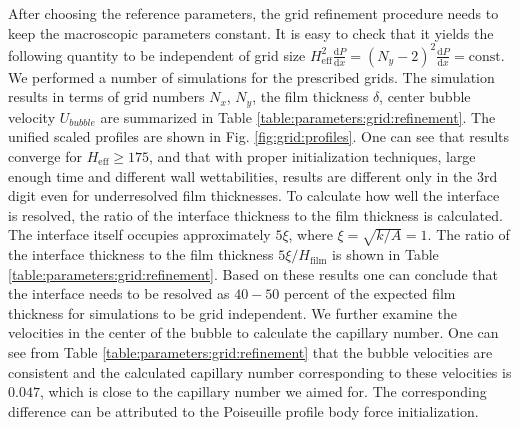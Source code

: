 \documentclass[preprint,12pt]{elsarticle}
\begin{document}
After choosing the reference parameters, the grid refinement procedure
needs to keep the macroscopic parameters constant.  It is easy to check
that it yields the following quantity to
be independent of grid size
$H_{\mathrm{eff}}^2\frac{\mathrm{d}P}{\mathrm{d}x}=(N_y-2)^2\frac{\mathrm{d}P}{\mathrm{d}
x } = \mathrm{const}$. We performed a number of simulations for the prescribed grids. The
simulation results in terms of grid numbers $N_x$, $N_y$, the film thickness $\delta$, center bubble
velocity $U_{bubble}$ are summarized in Table \ref{table:parameters:grid:refinement}.
The unified scaled profiles are shown in Fig. \ref{fig:grid:profiles}. One can
see that results converge for $H_{\mathrm{eff}}\geq 175$, and that with proper
initialization techniques, large enough time and different wall
wettabilities, results are different only in the 3rd digit even for
underresolved film thicknesses. To calculate how well the interface is
resolved, the ratio of the interface thickness to the film thickness is calculated. The
interface itself occupies approximately $5 \xi$, where
$\xi=\sqrt{k/A}=1$. The ratio of the interface thickness to the film thickness
$5\xi/H_{\mathrm{film}}$
 is shown in Table \ref{table:parameters:grid:refinement}. Based on these results one can conclude that
 the interface needs to be resolved as $40-50$ percent of the
expected film thickness for simulations to be grid independent. We further examine the
velocities in the center of the bubble to calculate the capillary number. One can see from Table
\ref{table:parameters:grid:refinement} that the bubble velocities are consistent and the
calculated capillary number corresponding to these velocities is $0.047$, which is {\color{red}
close to} the capillary number we aimed for. The corresponding difference can be
attributed to the Poiseuille profile body force initialization.%
\end{document}
